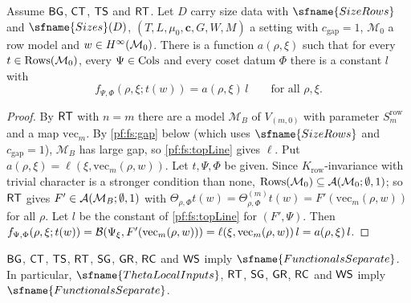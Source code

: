 \begin{proposition}\label{pf:fs:factor}
Assume $\mathsf{BG}$, $\mathsf{CT}$, $\mathsf{TS}$ and $\mathsf{RT}$. Let $D$ carry size data with $\sfname{SizeRows}$ and $\sfname{Sizes}(D)$,
$(T,L,\mu_0,\mathbf c,G,W,M)$ a setting with $c_{\mathrm{gap}}=1$, $\mathcal M_0$ a row model and $w\in H^{\infty}(\mathcal M_0)$. There is a
function $a(\rho,\xi)$ such that for every $t\in\mathrm{Rows}(\mathcal M_0)$, every $\Psi\in\mathrm{Cols}$ and every coset datum $\Phi$ there is
a constant $l$ with
\[
f_{\Psi,\Phi}(\rho,\xi;t(w))=a(\rho,\xi)\,l\qquad\text{for all }\rho,\xi .
\]
\end{proposition}

\begin{proof}
By $\mathsf{RT}$ with $n=m$ there are a model $\mathcal M_B$ of $V_{(m,0)}$ with parameter $S^{\mathrm{row}}_m$ and a map
$\mathrm{vec}_m$. By \cref{pf:fs:gap} below (which uses $\sfname{SizeRows}$ and $c_{\mathrm{gap}}=1$), $\mathcal M_B$ has large gap, so
\cref{pf:fs:topLine} gives $\ell$. Put $a(\rho,\xi)=\ell(\xi,\mathrm{vec}_m(\rho,w))$. Let $t,\Psi,\Phi$ be given. Since
$K_{\mathrm{row}}$-invariance with trivial character is a stronger condition than none,
$\mathrm{Rows}(\mathcal M_0)\subseteq\mathcal A(\mathcal M_0;\emptyset,1)$; so $\mathsf{RT}$ gives $F'\in\mathcal A(\mathcal M_B;\emptyset,1)$ with
$\Theta_{\rho,\Phi}t(w)=\Theta^{(m)}_{\rho,\Phi}t(w)=F'(\mathrm{vec}_m(\rho,w))$ for all $\rho$. Let $l$ be the constant of
\cref{pf:fs:topLine} for $(F',\Psi)$. Then
$f_{\Psi,\Phi}(\rho,\xi;t(w))=\mathcal B(\Psi_\xi,F'(\mathrm{vec}_m(\rho,w)))=\ell(\xi,\mathrm{vec}_m(\rho,w))\,l=a(\rho,\xi)\,l$.
\end{proof}

\begin{proposition}[Separation]\label{pf:fs:besselSep}
$\mathsf{BG}$, $\mathsf{CT}$, $\mathsf{TS}$, $\mathsf{RT}$, $\mathsf{SG}$, $\mathsf{GR}$, $\mathsf{RC}$ and $\mathsf{WS}$ imply
$\sfname{FunctionalsSeparate}$. In particular, $\sfname{ThetaLocalInputs}$, $\mathsf{RT}$, $\mathsf{SG}$, $\mathsf{GR}$, $\mathsf{RC}$ and
$\mathsf{WS}$ imply $\sfname{FunctionalsSeparate}$.
\end{proposition}

